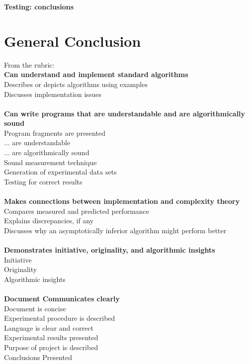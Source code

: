 \documentclass{IEEEtran}
\begin{document}
\textbf{Testing: conclusions}

\section{General Conclusion}

\noindent
From the rubric:\\
\textbf{Can understand and implement standard algorithms}\\
Describes or depicts algorithms using examples\\
Discusses implementation issues\\
\\
\textbf{Can write programs that are understandable and are algorithmically sound}\\
Program fragments are presented\\
... are understandable\\
... are algorithmically sound\\
Sound measurement technique\\
Generation of experimental data sets\\
Testing for correct results\\
\\
\textbf{Makes connections between implementation and complexity theory}\\
Compares measured and predicted performance\\
Explains discrepancies, if any\\
Discusses why an asymptotically inferior algorithm might perform better\\
\\
\textbf{Demonstrates initiative, originality, and algorithmic insights}\\
Initiative\\
Originality\\
Algorithmic insights\\
\\
\textbf{Document Communicates clearly}\\
Document is concise \\
Experimental procedure is described \\
Language is clear and correct \\
Experimental results presented \\
Purpose of project is described \\
Conclusions Presented \\

\pagebreak


\end{document}
